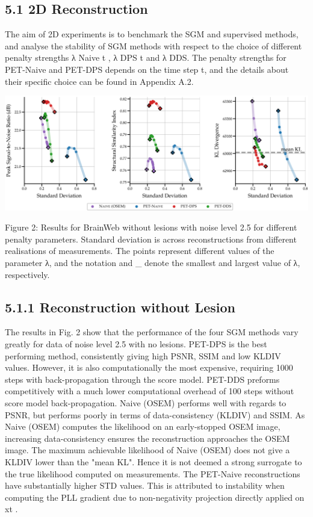 \documentclass{article}
\begin{document}
\subsection{5.1 2D Reconstruction}

The aim of 2D experiments is to benchmark the SGM and supervised methods, and analyse the stability of SGM methods with respect to the choice of different penalty strengths λ Naive t , λ DPS t and λ DDS. The penalty strengths for PET-Naive and PET-DPS depends on the time step t, and the details about their specific choice can be found in Appendix A.2.


\includegraphics{_page_13_Figure_1.png}


Figure 2: Results for BrainWeb without lesions with noise level 2.5 for different penalty parameters. Standard deviation is across reconstructions from different realisations of measurements. The points represent different values of the parameter λ, and the notation and \_ denote the smallest and largest value of λ, respectively.

\subsection{5.1.1 Reconstruction without Lesion}

The results in Fig. 2 show that the performance of the four SGM methods vary greatly for data of noise level 2.5 with no lesions. PET-DPS is the best performing method, consistently giving high PSNR, SSIM and low KLDIV values. However, it is also computationally the most expensive, requiring 1000 steps with back-propagation through the score model. PET-DDS preforms competitively with a much lower computational overhead of 100 steps without score model back-propagation. Naive (OSEM) performs well with regards to PSNR, but performs poorly in terms of data-consistency (KLDIV) and SSIM. As Naive (OSEM) computes the likelihood on an early-stopped OSEM image, increasing data-consistency ensures the reconstruction approaches the OSEM image. The maximum achievable likelihood of Naive (OSEM) does not give a KLDIV lower than the "mean KL". Hence it is not deemed a strong surrogate to the true likelihood computed on measurements. The PET-Naive reconstructions have substantially higher STD values. This is attributed to instability when computing the PLL gradient due to non-negativity projection directly applied on xt .
\end{document}
